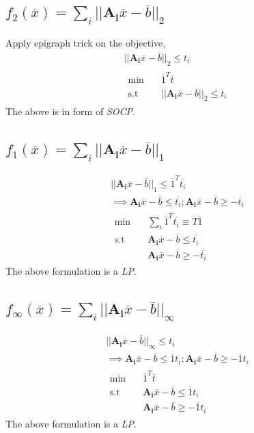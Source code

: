 \documentclass{article}
\begin{document}
\subsection*{$f_2(\overline{x}) = \sum_{i}||\mathbf{A_i}\overline{x} - \overline{b}||_2$}
Apply epigraph trick on the objective,
\begin{gather*}
	||\mathbf{A_i}\overline{x} - \overline{b}||_2 \le t_i\\
	\begin{aligned}
		\min \quad & \overline{1}^T\overline{t}\\
		\textrm{s.t} \quad & ||\mathbf{A_i}\overline{x} - \overline{b}||_2 \le t_i
	\end{aligned}
\end{gather*}
The above is in form of \textit{SOCP}.
\subsection*{$f_1(\overline{x}) = \sum_{i}||\mathbf{A_i}\overline{x} - \overline{b}||_1$}
\begin{gather*}
	||\mathbf{A_i}\overline{x} - \overline{b}||_1 \le \overline{1}^T\overline{t_i}\\
	\implies \mathbf{A_i}\overline{x} - \overline{b} \le \overline{t_i}; \mathbf{A_i}\overline{x} - \overline{b} \ge -\overline{t_i}\\
	\begin{aligned}
		\min \quad & \sum_{i}\overline{1}^T\overline{t_i} \equiv T\overline{1}\\
		\textrm{s.t} \quad & \mathbf{A_i}\overline{x} - \overline{b} \le \overline{t_i}\\
		& \mathbf{A_i}\overline{x} - \overline{b} \ge -\overline{t_i}
	\end{aligned}
\end{gather*}
The above formulation is a \textit{LP}.
\subsection*{$f_\infty(\overline{x}) = \sum_{i}||\mathbf{A_i}\overline{x} - \overline{b}||_\infty$}
\begin{gather*}
	||\mathbf{A_i}\overline{x} - \overline{b}||_\infty \le t_i\\
	\implies \mathbf{A_i}\overline{x} - \overline{b} \le \overline{1}t_i; \mathbf{A_i}\overline{x} - \overline{b} \ge -\overline{1}t_i\\
	\begin{aligned}
		\min \quad & \overline{1}^T\overline{t} \\
		\textrm{s.t} \quad & \mathbf{A_i}\overline{x} - \overline{b} \le \overline{1}t_i\\
		& \mathbf{A_i}\overline{x} - \overline{b} \ge -\overline{1}t_i
	\end{aligned}
\end{gather*}
The above formulation is a \textit{LP}.
\end{document}
